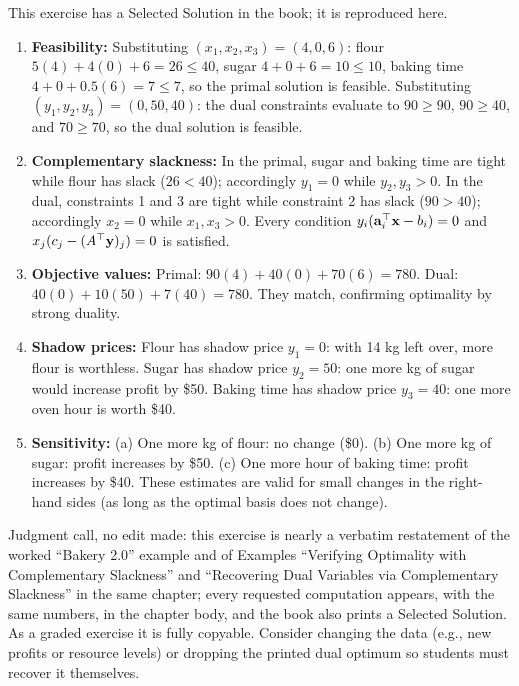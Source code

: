 
This exercise has a Selected Solution in the book; it is reproduced here.

\begin{enumerate}
\item \textbf{Feasibility:} Substituting $(x_1, x_2, x_3) = (4, 0, 6)$: flour $5(4) + 4(0) + 6 = 26 \leq 40$, sugar $4 + 0 + 6 = 10 \leq 10$, baking time $4 + 0 + 0.5(6) = 7 \leq 7$, so the primal solution is feasible. Substituting $(y_1, y_2, y_3) = (0, 50, 40)$: the dual constraints evaluate to $90 \geq 90$, $90 \geq 40$, and $70 \geq 70$, so the dual solution is feasible.
\item \textbf{Complementary slackness:} In the primal, sugar and baking time are tight while flour has slack ($26 < 40$); accordingly $y_1 = 0$ while $y_2, y_3 > 0$. In the dual, constraints 1 and 3 are tight while constraint 2 has slack ($90 > 40$); accordingly $x_2 = 0$ while $x_1, x_3 > 0$. Every condition $y_i(\mathbf{a}_i^\top \mathbf{x} - b_i) = 0$ and $x_j(c_j - (A^\top \mathbf{y})_j) = 0$ is satisfied.
\item \textbf{Objective values:} Primal: $90(4) + 40(0) + 70(6) = 780$. Dual: $40(0) + 10(50) + 7(40) = 780$. They match, confirming optimality by strong duality.
\item \textbf{Shadow prices:} Flour has shadow price $y_1 = 0$: with 14 kg left over, more flour is worthless. Sugar has shadow price $y_2 = 50$: one more kg of sugar would increase profit by \$50. Baking time has shadow price $y_3 = 40$: one more oven hour is worth \$40.
\item \textbf{Sensitivity:} (a) One more kg of flour: no change (\$0). (b) One more kg of sugar: profit increases by \$50. (c) One more hour of baking time: profit increases by \$40. These estimates are valid for small changes in the right-hand sides (as long as the optimal basis does not change).
\end{enumerate}

\begin{qaflag}
Judgment call, no edit made: this exercise is nearly a verbatim restatement of the worked ``Bakery 2.0'' example and of Examples ``Verifying Optimality with Complementary Slackness'' and ``Recovering Dual Variables via Complementary Slackness'' in the same chapter; every requested computation appears, with the same numbers, in the chapter body, and the book also prints a Selected Solution. As a graded exercise it is fully copyable. Consider changing the data (e.g., new profits or resource levels) or dropping the printed dual optimum so students must recover it themselves.
\end{qaflag}

